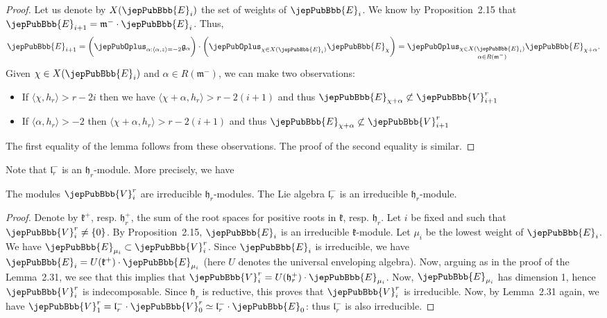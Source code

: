 \begin{proof}
Let us denote by $X(\jepPubBbb{E}_i)$ the set of weights of $\jepPubBbb{E}_i$. We know by Proposition~2.15 that $\jepPubBbb{E}_{i+1}=\mathfrak m^-\cdot\jepPubBbb{E}_i$. Thus,
\[
\jepPubBbb{E}_{i+1}=\biggl(\jepPubOplus_{\alpha:\langle\alpha,z\rangle=-2}\mathfrak g_\alpha\biggr)\cdot\biggl(\jepPubOplus_{\chi\in X(\jepPubBbb{E}_i)}\jepPubBbb{E}_\chi\biggr)=\jepPubOplus_{\substack{\chi\in X(\jepPubBbb{E}_i)\\\alpha\in R(\mathfrak m^-)}}\jepPubBbb{E}_{\chi+\alpha}.
\]
Given $\chi\in X(\jepPubBbb{E}_i)$ and $\alpha\in R(\mathfrak m^-)$, we can make two observations:
\begin{itemize}
\item If $\langle\chi,h_r\rangle>r-2i$ then we have $\langle\chi+\alpha,h_r\rangle>r-2(i+1)$ and thus $\jepPubBbb{E}_{\chi+\alpha}\not\subset\jepPubBbb{V}^r_{i+1}$
\item If $\langle\alpha,h_r\rangle>-2$ then $\langle\chi+\alpha,h_r\rangle>r-2(i+1)$ and thus $\jepPubBbb{E}_{\chi+\alpha}\not\subset\jepPubBbb{V}^r_{i+1}$
\end{itemize}
The first equality of the lemma follows from these observations. The proof of the second equality is similar.
\end{proof}
Note that $\mathfrak l_r^-$ is an $\mathfrak h_r$-module. More precisely, we have
\begin{lemma}
The modules $\jepPubBbb{V}^r_i$ are irreducible $\mathfrak h_r$-modules. The Lie algebra $\mathfrak l_r^-$ is an irreducible $\mathfrak h_r$-module.
\end{lemma}
\begin{proof}
Denote by $\mathfrak k^+$, resp. $\mathfrak h_r^+$, the sum of the root spaces for positive roots in $\mathfrak k$, resp. $\mathfrak h_r$. Let $i$ be fixed and such that $\jepPubBbb{V}^r_i\neq\{0\}$. By Proposition~2.15, $\jepPubBbb{E}_i$ is an irreducible $\mathfrak k$-module. Let $\mu_i$ be the lowest weight of $\jepPubBbb{E}_i$. We have $\jepPubBbb{E}_{\mu_i}\subset\jepPubBbb{V}^r_i$. Since $\jepPubBbb{E}_i$ is irreducible, we have $\jepPubBbb{E}_i=U(\mathfrak k^+)\cdot\jepPubBbb{E}_{\mu_i}$ (here $U$ denotes the universal enveloping algebra). Now, arguing as in the proof of the Lemma~2.31, we see that this implies that $\jepPubBbb{V}^r_i=U(\mathfrak h_r^+)\cdot\jepPubBbb{E}_{\mu_i}$. Now, $\jepPubBbb{E}_{\mu_i}$ has dimension 1, hence $\jepPubBbb{V}^r_i$ is indecomposable. Since $\mathfrak h_r$ is reductive, this proves that $\jepPubBbb{V}^r_i$ is irreducible. Now, by Lemma~2.31 again, we have $\jepPubBbb{V}^r_1=\mathfrak l_r^-\cdot\jepPubBbb{V}^r_0\simeq\mathfrak l_r^-\cdot\jepPubBbb{E}_0$: thus $\mathfrak l_r^-$ is also irreducible.
\end{proof}
